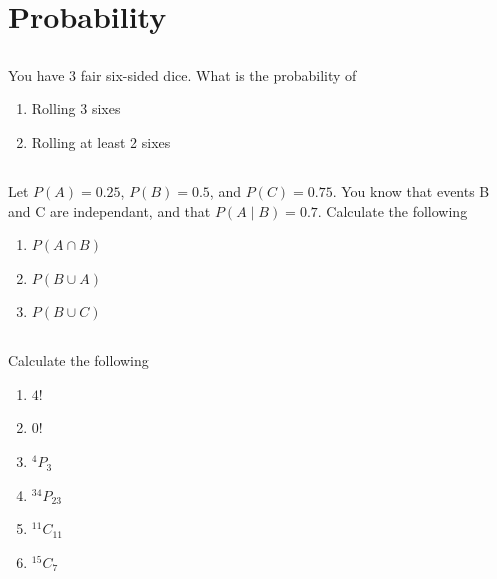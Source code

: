 \documentclass[twocolumn]{article}
\begin{document}
\clearpage
\section{Probability}

\subsection{}

    You have 3 fair six-sided dice. What is the probability of

    \begin{enumerate}
        \item Rolling 3 sixes
        \item Rolling at least 2 sixes
    \end{enumerate}

\subsection{}

    Let $P(A) = 0.25$, $P(B) = 0.5$, and $P(C) = 0.75$. You know that events B and C are independant, and that $P(A \mid B ) = 0.7 $. Calculate the following

    \begin{enumerate}
        \item $P(A \cap B)$
        \item $P(B \cup A)$
        \item $P(B \cup C)$
    \end{enumerate}

\subsection{}

    Calculate the following

    \begin{multicols}{2}
        \begin{enumerate}
            \item $ 4! $
            \item $ 0! $
            \item $ ^4P_3 $
            \item $ ^{34}P_{23} $
            \item $ ^{11}C_{11} $
            \item $ ^{15}C_{7} $
        \end{enumerate}
    \end{multicols}
\end{document}
